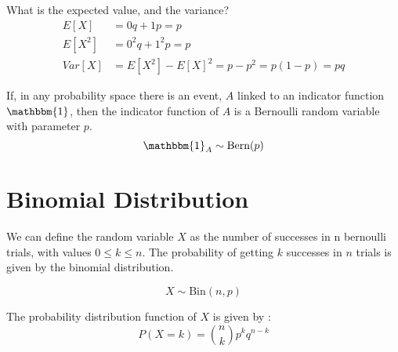 What is the expected value, and the variance?
\begin{equation}
\begin{aligned}
    E[X] & = 0 q + 1 p = p \\
    E[X^2] & = 0^2 q + 1^2 p = p \\
    Var[X] & = E[X^2] - E[X]^2 = p - p^2 = p(1-p) = pq
\end{aligned}
\end{equation}

If, in any probability space there is an event, $A$ linked to an indicator function $\mathbbm{1}$, then the indicator function of $A$ is a Bernoulli random variable with parameter $p$.
\[
\mathbbm{1}_A \sim \text{Bern}(p)
\]

\newpage
\section{Binomial Distribution}


We can define the random variable $X$ as the number of successes in n bernoulli trials, with values $0 \leq k \leq n$. The probability of getting $k$ successes in $n$ trials is given by the binomial distribution.

\[ 
X \sim \text{Bin}(n, p)
\]

The probability distribution function of $X$ is given by
:
\begin{equation}
    P(X=k) = \binom{n}{k} p^k q^{n-k}
\end{equation}

